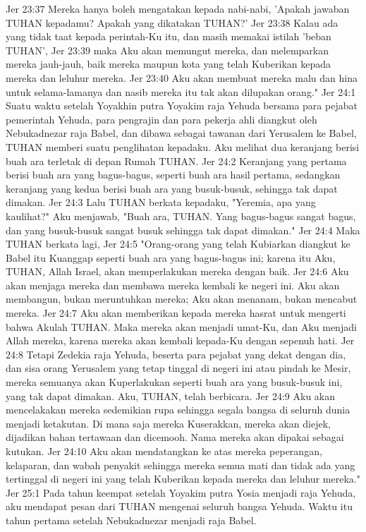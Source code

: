 Jer 23:37  Mereka hanya boleh mengatakan kepada nabi-nabi, 'Apakah jawaban TUHAN kepadamu? Apakah yang dikatakan TUHAN?'
Jer 23:38  Kalau ada yang tidak taat kepada perintah-Ku itu, dan masih memakai istilah 'beban TUHAN',
Jer 23:39  maka Aku akan memungut mereka, dan melemparkan mereka jauh-jauh, baik mereka maupun kota yang telah Kuberikan kepada mereka dan leluhur mereka.
Jer 23:40  Aku akan membuat mereka malu dan hina untuk selama-lamanya dan nasib mereka itu tak akan dilupakan orang."
Jer 24:1  Suatu waktu setelah Yoyakhin putra Yoyakim raja Yehuda bersama para pejabat pemerintah Yehuda, para pengrajin dan para pekerja ahli diangkut oleh Nebukadnezar raja Babel, dan dibawa sebagai tawanan dari Yerusalem ke Babel, TUHAN memberi suatu penglihatan kepadaku. Aku melihat dua keranjang berisi buah ara terletak di depan Rumah TUHAN.
Jer 24:2  Keranjang yang pertama berisi buah ara yang bagus-bagus, seperti buah ara hasil pertama, sedangkan keranjang yang kedua berisi buah ara yang busuk-busuk, sehingga tak dapat dimakan.
Jer 24:3  Lalu TUHAN berkata kepadaku, "Yeremia, apa yang kaulihat?" Aku menjawab, "Buah ara, TUHAN. Yang bagus-bagus sangat bagus, dan yang busuk-busuk sangat busuk sehingga tak dapat dimakan."
Jer 24:4  Maka TUHAN berkata lagi,
Jer 24:5  "Orang-orang yang telah Kubiarkan diangkut ke Babel itu Kuanggap seperti buah ara yang bagus-bagus ini; karena itu Aku, TUHAN, Allah Israel, akan memperlakukan mereka dengan baik.
Jer 24:6  Aku akan menjaga mereka dan membawa mereka kembali ke negeri ini. Aku akan membangun, bukan meruntuhkan mereka; Aku akan menanam, bukan mencabut mereka.
Jer 24:7  Aku akan memberikan kepada mereka hasrat untuk mengerti bahwa Akulah TUHAN. Maka mereka akan menjadi umat-Ku, dan Aku menjadi Allah mereka, karena mereka akan kembali kepada-Ku dengan sepenuh hati.
Jer 24:8  Tetapi Zedekia raja Yehuda, beserta para pejabat yang dekat dengan dia, dan sisa orang Yerusalem yang tetap tinggal di negeri ini atau pindah ke Mesir, mereka semuanya akan Kuperlakukan seperti buah ara yang busuk-busuk ini, yang tak dapat dimakan. Aku, TUHAN, telah berbicara.
Jer 24:9  Aku akan mencelakakan mereka sedemikian rupa sehingga segala bangsa di seluruh dunia menjadi ketakutan. Di mana saja mereka Kuserakkan, mereka akan diejek, dijadikan bahan tertawaan dan dicemooh. Nama mereka akan dipakai sebagai kutukan.
Jer 24:10  Aku akan mendatangkan ke atas mereka peperangan, kelaparan, dan wabah penyakit sehingga mereka semua mati dan tidak ada yang tertinggal di negeri ini yang telah Kuberikan kepada mereka dan leluhur mereka."
Jer 25:1  Pada tahun keempat setelah Yoyakim putra Yosia menjadi raja Yehuda, aku mendapat pesan dari TUHAN mengenai seluruh bangsa Yehuda. Waktu itu tahun pertama setelah Nebukadnezar menjadi raja Babel.
